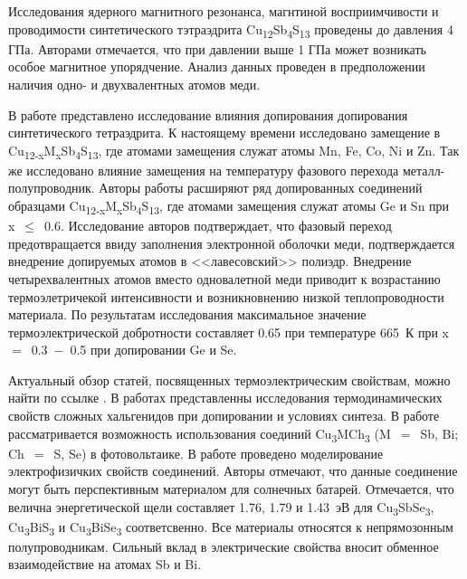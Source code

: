 Исследования ядерного магнитного резонанса, магнтиной восприимчивости и проводимости синтетического тэтраэдрита Cu\textsubscript{12}Sb\textsubscript{4}S\textsubscript{13} проведены\cite{Kitagawa2015} до давления 4 ГПа. Авторами отмечается, что при давлении выше 1 ГПа может возникать особое магнитное упорядчение. Анализ данных проведен в предположении наличия одно- и двухвалентных атомов меди.


В работе \cite{Kosaka2017} представлено исследование влияния  допирования допирования синтетического тетраэдрита. К настоящему времени исследовано замещение в Cu\textsubscript{12-x}M\textsubscript{x}Sb\textsubscript{4}S\textsubscript{13}, где атомами замещения служат атомы Mn, Fe, Co, Ni и Zn. Так же исследовано влияние замещения на температуру фазового перехода металл-полупроводник. Авторы работы расширяют ряд допированных соединений образцами Cu\textsubscript{12-x}M\textsubscript{x}Sb\textsubscript{4}S\textsubscript{13}, где атомами замещения служат атомы Ge и Sn при x~$\leq $~0.6. Исследование авторов подтверждает, что фазовый переход предотвращается ввиду заполнения электронной оболочки меди, подтверждается внедрение допируемых атомов в <<лавесовский>> полиэдр. Внедрение четырехвалентных атомов вместо одновалетной меди приводит к возрастанию термоэлетричекой интенсивности и возникновнению низкой теплопроводности материала. По результатам исследования максимальное значение термоэлектрической добротности составляет 0.65 при температуре 665~К при x~$=$~0.3~$-$~0.5 при допировании Ge и Se.

Актуальный обзор статей, посвященных термоэлектрическим свойствам,  можно найти по ссылке \cite{Powella}. В работах \cite{ther_10.1007/s11664-016-4893-7,ther_10.1016/j.intermet.2016.08.003,ther_10.1016/j.jallcom.2017.01.187,ther_10.1039/C7RA02564E,ther_10.1039/C7TC00762K,ther_AENM:AENM201200650,ther_C5TC01636C,ther_C6DT00564K,ther_doi:10.1021/acs.chemmater.7b00891,ther_doi:10.1021/acs.inorgchem.7b02128,ther_doi:10.1021/acs.jpcc.7b02068,ther_doi.org/10.1016/j.jssc.2017.01.003,ther_GONCALVES2016209,ther_HARISH2016323,ther_JACE:JACE13838,ther_lu2014effect}  представленны исследования термодинамических свойств сложных хальгенидов при допировании и условиях синтеза. 
В работе \cite{Kehoe_2013} рассматривается возможность использования соединий Cu\textsubscript{3}MCh\textsubscript{3} (M~$=$~Sb, Bi; Ch~$=$~S, Se) в фотовольтаике. В работе проведено моделирование электрофизичких свойств соединений.
Авторы отмечают, что данные соединение могут быть перспективным материалом для солнечных батарей. Отмечается, что велична энергетической щели составляет 1.76, 1.79 и 1.43~эВ для Cu\textsubscript{3}SbSe\textsubscript{3}, Cu\textsubscript{3}BiS\textsubscript{3} и Cu\textsubscript{3}BiSe\textsubscript{3} соответсвенно. Все материалы относятся к непрямозонным полупроводникам. Сильный вклад в электрические свойства вносит обменное взаимодействие на атомах Sb и Bi.
\newpage

